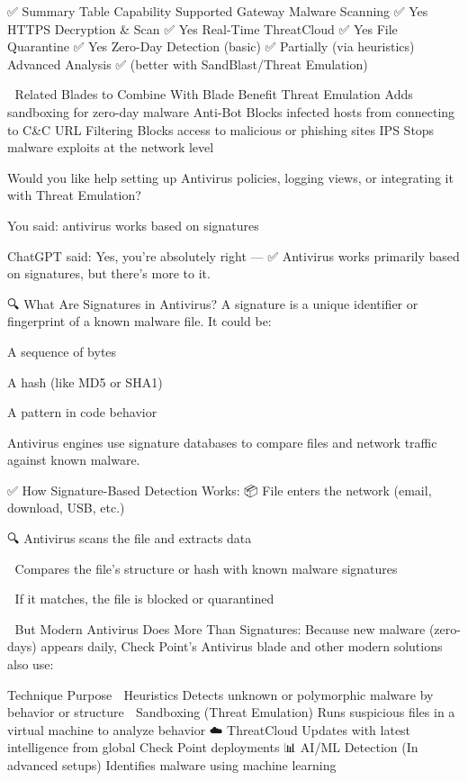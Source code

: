 ✅ Summary Table
Capability	Supported
Gateway Malware Scanning	✅ Yes
HTTPS Decryption & Scan	✅ Yes
Real-Time ThreatCloud	✅ Yes
File Quarantine	✅ Yes
Zero-Day Detection (basic)	✅ Partially (via heuristics)
Advanced Analysis	✅ (better with SandBlast/Threat Emulation)

🔗 Related Blades to Combine With
Blade	Benefit
Threat Emulation	Adds sandboxing for zero-day malware
Anti-Bot	Blocks infected hosts from connecting to C&C
URL Filtering	Blocks access to malicious or phishing sites
IPS	Stops malware exploits at the network level

Would you like help setting up Antivirus policies, logging views, or integrating it with Threat Emulation?






You said:
antivirus works based on signatures


ChatGPT said:
Yes, you're absolutely right — ✅ Antivirus works primarily based on signatures, but there’s more to it.

🔍 What Are Signatures in Antivirus?
A signature is a unique identifier or fingerprint of a known malware file. It could be:

A sequence of bytes

A hash (like MD5 or SHA1)

A pattern in code behavior

Antivirus engines use signature databases to compare files and network traffic against known malware.

✅ How Signature-Based Detection Works:
📦 File enters the network (email, download, USB, etc.)

🔍 Antivirus scans the file and extracts data

🔗 Compares the file's structure or hash with known malware signatures

🚫 If it matches, the file is blocked or quarantined

🧠 But Modern Antivirus Does More Than Signatures:
Because new malware (zero-days) appears daily, Check Point’s Antivirus blade and other modern solutions also use:

Technique	Purpose
🧬 Heuristics	Detects unknown or polymorphic malware by behavior or structure
🔬 Sandboxing (Threat Emulation)	Runs suspicious files in a virtual machine to analyze behavior
☁️ ThreatCloud	Updates with latest intelligence from global Check Point deployments
📊 AI/ML Detection	(In advanced setups) Identifies malware using machine learning

